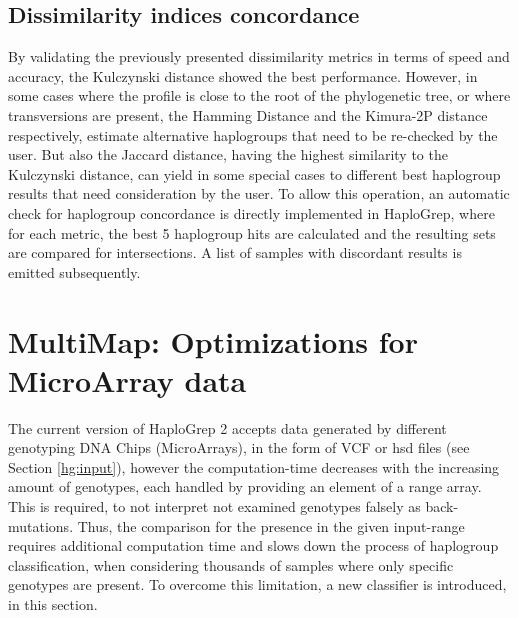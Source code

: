 \subsection{Dissimilarity indices concordance }
By validating the previously presented dissimilarity metrics in terms of speed and accuracy, the Kulczynski distance showed the best performance. However, in some cases where the profile is close to the root of the phylogenetic tree, or where transversions are present, the Hamming Distance and the Kimura-2P distance respectively, estimate alternative haplogroups that need to be re-checked by the user. But also the Jaccard distance, having the highest similarity to the Kulczynski distance, can yield in some special cases to different best haplogroup results that need consideration by the user. To allow this operation, an automatic check for haplogroup concordance is directly implemented in HaploGrep, where for each metric, the best 5 haplogroup hits are calculated and the resulting sets are compared for intersections. A list of samples with discordant results is emitted subsequently. 

\section{MultiMap: Optimizations for MicroArray data}\label{hg:optimization}
The current version of HaploGrep 2 accepts data generated by different genotyping DNA Chips (MicroArrays), in the form of VCF or hsd files (see Section \ref{hg:input}), however the computation-time decreases with the increasing amount of genotypes, each handled by providing an element of a range array. This is required, to not interpret not examined genotypes falsely as back-mutations. Thus, the comparison for the presence in the given input-range requires additional computation time and slows down the process of haplogroup classification, when considering thousands of samples where only specific genotypes are present. To overcome this limitation, a new classifier is introduced, in this section. 
